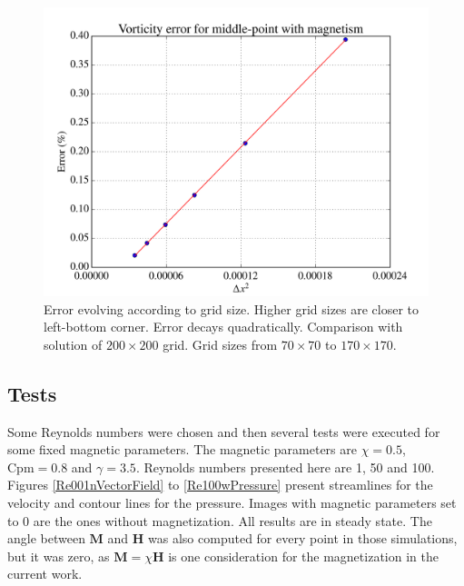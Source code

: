 \documentclass[journal]{IEEEtran}
\begin{document}
\begin{figure}[!t]
\centering
\includegraphics[width=\linewidth]{figures/validateMagnetismRe40}
\caption{Error evolving according to grid size. Higher grid sizes are closer to left-bottom corner. Error decays quadratically. Comparison with solution of $200\times 200$ grid. Grid sizes from $70\times 70$ to $170\times 170$. \label{magneticTest}}
\end{figure}



\subsection{Tests}
Some Reynolds numbers were chosen and then several tests were executed for some fixed magnetic parameters. The magnetic parameters are $\chi=0.5$, $\mathrm{Cpm}=0.8$ and $\gamma=3.5$. Reynolds numbers presented here are 1, 50 and 100. Figures \ref{Re001nVectorField} to \ref{Re100wPressure} present streamlines for the velocity and contour lines for the pressure. Images with magnetic parameters set to 0 are the ones without magnetization. All results are in steady state. The angle between $\mathbf{M}$ and $\mathbf{H}$ was also computed for every point in those simulations, but it was zero, as $\mathbf{M}=\chi\mathbf{H}$ is one consideration for the magnetization in the current work.
\end{document}
